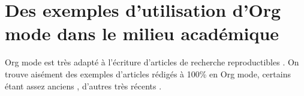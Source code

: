 \documentclass[11pt]{article}
\begin{document}
\section{Des exemples d'utilisation d'Org mode dans le milieu académique}
\label{sec:orgc7a2543}
Org mode est très adapté à l'écriture d'articles de recherche reproductibles \citep{schulte2012_MultiLanguageComputingEnvironment}. On trouve aisément des exemples d'articles rédigés à 100\% en Org mode, certains étant assez anciens \citep[e.g.,][]{dye2011_ModelbasedAgeEstimate}, d'autres très récents \citep{santos2020_ModernMethodsOld,fraga2021_MultipleSimultaneousSolution}.



\end{document}

